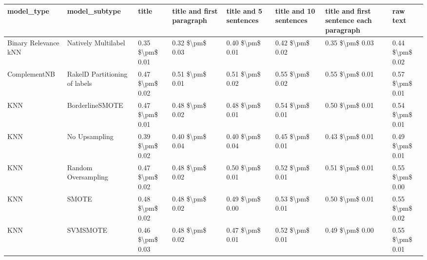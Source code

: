 \begin{tabular}{llllllll}
\toprule
                     model\_type &                 model\_subtype &           title & title and first paragraph & title and 5 sentences & title and 10 sentences & title and first sentence each paragraph &            raw text \\
\midrule
           Binary Relevance kNN &           Natively Multilabel & 0.35 \$\textbackslash pm\$ 0.01 &           0.32 \$\textbackslash pm\$ 0.03 &       0.40 \$\textbackslash pm\$ 0.01 &        0.42 \$\textbackslash pm\$ 0.02 &                         0.35 \$\textbackslash pm\$ 0.03 &     0.44 \$\textbackslash pm\$ 0.02 \\
                   ComplementNB & RakelD Partitioning of labels & 0.47 \$\textbackslash pm\$ 0.02 &           0.51 \$\textbackslash pm\$ 0.01 &       0.51 \$\textbackslash pm\$ 0.02 &        0.55 \$\textbackslash pm\$ 0.02 &                         0.55 \$\textbackslash pm\$ 0.01 &     0.57 \$\textbackslash pm\$ 0.01 \\
                            KNN &               BorderlineSMOTE & 0.47 \$\textbackslash pm\$ 0.01 &           0.48 \$\textbackslash pm\$ 0.02 &       0.48 \$\textbackslash pm\$ 0.01 &        0.54 \$\textbackslash pm\$ 0.01 &                         0.50 \$\textbackslash pm\$ 0.01 &     0.54 \$\textbackslash pm\$ 0.01 \\
                            KNN &                 No Upsampling & 0.39 \$\textbackslash pm\$ 0.02 &           0.40 \$\textbackslash pm\$ 0.04 &       0.40 \$\textbackslash pm\$ 0.04 &        0.45 \$\textbackslash pm\$ 0.01 &                         0.43 \$\textbackslash pm\$ 0.01 &     0.49 \$\textbackslash pm\$ 0.01 \\
                            KNN &           Random Oversampling & 0.47 \$\textbackslash pm\$ 0.02 &           0.48 \$\textbackslash pm\$ 0.02 &       0.50 \$\textbackslash pm\$ 0.01 &        0.52 \$\textbackslash pm\$ 0.01 &                         0.51 \$\textbackslash pm\$ 0.01 &     0.55 \$\textbackslash pm\$ 0.00 \\
                            KNN &                         SMOTE & 0.48 \$\textbackslash pm\$ 0.02 &           0.48 \$\textbackslash pm\$ 0.02 &       0.49 \$\textbackslash pm\$ 0.00 &        0.53 \$\textbackslash pm\$ 0.01 &                         0.50 \$\textbackslash pm\$ 0.01 &     0.55 \$\textbackslash pm\$ 0.02 \\
                            KNN &                      SVMSMOTE & 0.46 \$\textbackslash pm\$ 0.03 &           0.48 \$\textbackslash pm\$ 0.02 &       0.47 \$\textbackslash pm\$ 0.01 &        0.52 \$\textbackslash pm\$ 0.01 &                         0.49 \$\textbackslash pm\$ 0.00 &     0.55 \$\textbackslash pm\$ 0.01 \\

\end{tabular}
